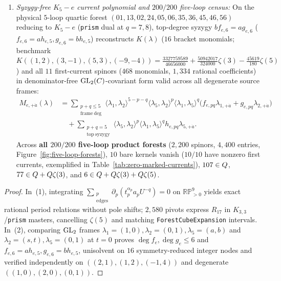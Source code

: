 \begin{theorem}
\begin{enumerate}[label=(\arabic*),leftmargin=*]
  \item \emph{Syzygy-free $K_5-e$ current polynomial and $200/200$ five-loop census:} On the physical $5$-loop quartic forest $(01,13,02,24,05,06,35,36,45,46,56)$ reducing to $K_5-e$ (\texttt{prism} dual at $q=7,8$), top-degree syzygy $b f_{e,6} = a g_{e,6}$ ($f_{e,6}=a h_{e,5}, g_{e,6}=b h_{e,5}$) reconstructs $K(\lambda)$ ($16$ bracket monomials; benchmark $K((1,2),(3,-1),(5,3),(-9,-4)) = \frac{3327759589}{46656000} + \frac{50942017}{324000}\zeta(3) - \frac{45619}{180}\zeta(5)$) and all $11$ first-current spinors ($468$ monomials, $1{,}334$ rational coefficients) in denominator-free $\operatorname{GL}_2(C)$-covariant form valid across all degenerate source frames:
  \begin{equation}
  \label{eq:k5me-covariant-current}
  \begin{aligned}
  M_{e,+\dot{a}}(\lambda) &= \sum_{\substack{p+q\le 5\\\mathrm{frame\ deg}}}\langle\lambda_1,\lambda_2\rangle^{5-p-q}\langle\lambda_5,\lambda_2\rangle^p\langle\lambda_1,\lambda_5\rangle^q\bigl(f_{e,pq}\lambda_{1,+\dot{a}} + g_{e,pq}\lambda_{2,+\dot{a}}\bigr)\\
  &\quad + \sum_{\substack{p+q=5\\\mathrm{top\ syzygy}}}\langle\lambda_5,\lambda_2\rangle^p\langle\lambda_1,\lambda_5\rangle^q h_{e,pq}\lambda_{5,+\dot{a}}.
  \end{aligned}
  \end{equation}
  Across \textbf{all $200/200$ five-loop product forests} ($2{,}200$ spinors, $4{,}400$ entries, Figure~\ref{fig:five-loop-forests}), $10$ bare kernels vanish ($10/10$ have nonzero first currents, exemplified in Table~\ref{tab:zero-marked-currents}), $107 \in Q$, $77 \in Q+Q\zeta(3)$, and $6 \in Q+Q\zeta(3)+Q\zeta(5)$.
\end{enumerate}
\end{theorem}

\begin{proof}
In~(1), integrating $\sum_{\substack{p\\\mathrm{edges}}}\partial_p(t_p^{\alpha_p}a_p U^{-q}) = 0$ on $\mathbb{RP}^9_{>0}$ yields exact rational period relations without pole shifts; $2{,}580$ pivots express $R_{17}$ in $K_{3,3}$/\texttt{prism} masters, cancelling $\zeta(5)$ and matching \texttt{ForestCubeExpansion} intervals. In~(2), comparing $\operatorname{GL}_2$ frames $\lambda_1=(1,0),\lambda_2=(0,1),\lambda_5=(a,b)$ and $\lambda_2=(s,t),\lambda_5=(0,1)$ at $t=0$ proves $\deg f_e,\deg g_e \le 6$ and $f_{e,6}=a h_{e,5}, g_{e,6}=b h_{e,5}$, unisolvent on $16$ symmetry-reduced integer nodes and verified independently on $((2,1),(1,2),(-1,4))$ and degenerate $((1,0),(2,0),(0,1))$.
\end{proof}

